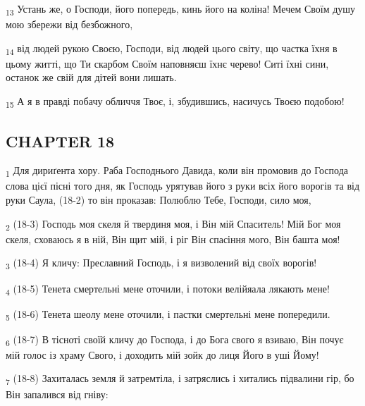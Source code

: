 \begin{tcolorbox}
\textsubscript{13} Устань же, о Господи, його попередь, кинь його на коліна! Мечем Своїм душу мою збережи від безбожного,
\end{tcolorbox}
\begin{tcolorbox}
\textsubscript{14} від людей рукою Своєю, Господи, від людей цього світу, що частка їхня в цьому житті, що Ти скарбом Своїм наповняєш їхнє черево! Ситі їхні сини, останок же свій для дітей вони лишать.
\end{tcolorbox}
\begin{tcolorbox}
\textsubscript{15} А я в правді побачу обличчя Твоє, і, збудившись, насичусь Твоєю подобою!
\end{tcolorbox}
\subsection{CHAPTER 18}
\begin{tcolorbox}
\textsubscript{1} Для дириґента хору. Раба Господнього Давида, коли він промовив до Господа слова цієї пісні того дня, як Господь урятував його з руки всіх його ворогів та від руки Саула, (18-2) то він проказав: Полюблю Тебе, Господи, сило моя,
\end{tcolorbox}
\begin{tcolorbox}
\textsubscript{2} (18-3) Господь моя скеля й твердиня моя, і Він мій Спаситель! Мій Бог моя скеля, сховаюсь я в ній, Він щит мій, і ріг Він спасіння мого, Він башта моя!
\end{tcolorbox}
\begin{tcolorbox}
\textsubscript{3} (18-4) Я кличу: Преславний Господь, і я визволений від своїх ворогів!
\end{tcolorbox}
\begin{tcolorbox}
\textsubscript{4} (18-5) Тенета смертельні мене оточили, і потоки велійяала лякають мене!
\end{tcolorbox}
\begin{tcolorbox}
\textsubscript{5} (18-6) Тенета шеолу мене оточили, і пастки смертельні мене попередили.
\end{tcolorbox}
\begin{tcolorbox}
\textsubscript{6} (18-7) В тісноті своїй кличу до Господа, і до Бога свого я взиваю, Він почує мій голос із храму Свого, і доходить мій зойк до лиця Його в уші Йому!
\end{tcolorbox}
\begin{tcolorbox}
\textsubscript{7} (18-8) Захиталась земля й затремтіла, і затряслись і хитались підвалини гір, бо Він запалився від гніву:
\end{tcolorbox}
